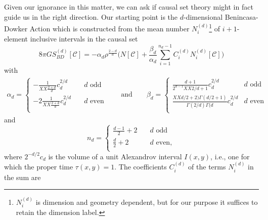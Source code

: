 \documentclass[12pt]{article}
\begin{document}
Given our ignorance in this matter,  we can ask if causal set theory  might  in fact guide us in the right direction.   Our starting point is the $d$-dimensional  Benincasa-Dowker Action \cite{Benincasa_Dowker:The_Scalar_Curvature_of_a_Causal_Set, Dowker_Glaser:dAlembertians_for_Causal_Sets} which is constructed from the mean number  $N_i^{(d)}${\footnote{ $N_i^{(d)}$ is dimension  and geometry dependent, but for our purpose it suffices to retain the dimension label. } of $i+1$-element inclusive intervals in the causal set 
\begin{equation}   
8 \pi G {S_{BD}^{(d)}}[\mathcal C] = -\alpha_d \rho^{\frac{2-d}{d}}\biggl( N[\mathcal C]+ \frac{\beta_d}{ \alpha_d} \sum_{i=1}^{n_d-1}  C^{(d)}_{i} N _i^{(d)}[\mathcal C] \biggr) 
\label{bd} 
\end{equation}  
with   
\begin{equation}
\begin{aligned}
 \alpha_d =   
\begin{cases}
-\frac{1}{XX\frac{2+d}{d}}c_d ^{2/d}  \quad   &d \, \, \mathrm{odd} \\
-2 \frac{1}{XX\frac{2+d}{d}}c_d ^{2/d}  \quad   &d \, \,  \mathrm{even} \\
\end{cases}
\qquad\text{and}\qquad \beta_d = 
\begin{cases} 
\frac{d+1}{2^{d-1}XX2/d +1} c_d^{2/d}   \quad   &d\mathrm{ \, \, odd}\\ 
\frac{XXd/2+2)\Gamma(d/2+1)}{\Gamma(2/d)\Gamma(d}c_d^{2/d}  &  d\mathrm{ \, \,  even}\\ 
\end{cases} 
\end{aligned}
\end{equation}
and
\begin{equation} 
n_d = 
\begin{cases} 
\frac{d-1}{2} + 2  \quad & d\mathrm{ \, \, odd}\\ 
\frac{d}{2} + 2  \quad &d\mathrm{ \, \,  even,}\\ 
\end{cases} 
\end{equation} 
where  $2^{-d/2} c_d$ is the volume of a unit Alexandrov interval $I(x,y)$, i.e., one for which the proper time $\tau(x,y)=1$. 
The coefficients $C_i^{(d)}$ of the terms $N_i^{(d)}$ in the sum are
\begin{equation}

\end{equation}}
\end{document}
